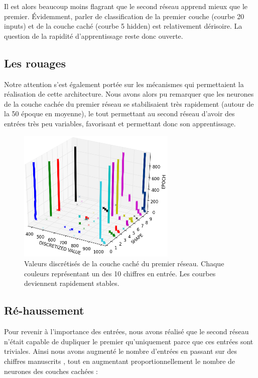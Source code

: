 \documentclass[a4paper,12pt, twoside]{article}
\begin{document}
Il est alors beaucoup moins flagrant que le second réseau apprend mieux que le premier.
Évidemment, parler de classification de la premier couche (courbe 20 inputs) et de la couche 
caché (courbe 5 hidden) est relativement dérisoire. 
\newline La question de la rapidité d'apprentissage reste donc ouverte.

\subsection{Les rouages}

Notre attention s'est également portée sur les mécanismes qui permettaient la réalisation de cette architecture.
Nous avons alors pu remarquer que les neurones de la couche cachée du premier
réseau se stabilisaient très rapidement (autour de la 50 époque en moyenne), le tout
permettant au second réseau d'avoir des entrées très peu variables, favorisant et permettant
donc son apprentissage.

\begin{figure}[H]
\begin{center}
 \includegraphics[height=240px]{../cleeremans_2007/digit_reco/discretize_cloud.png}
\end{center}
\caption{ Valeurs discrétisés de la couche caché du premier réseau. Chaque couleurs 
représentant un des 10 chiffres en entrée. Les courbes deviennent rapidement stables.}
\end{figure}


\subsection{Ré-haussement}

Pour revenir à l'importance des entrées, nous avons réalisé que le second réseau
n'était capable de dupliquer le premier qu'uniquement parce que ces entrées 
sont triviales.
Ainsi nous avons augmenté le nombre d'entrées en passant sur des chiffres
manuscrits \cite{Handwritten_256}, tout en augmentant proportionnellement le nombre de 
neurones des couches cachées :
\end{document}
